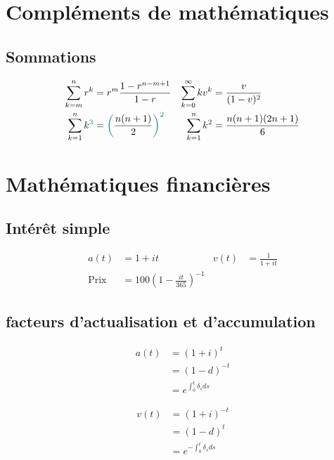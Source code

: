 \documentclass[10pt, french]{article}
\begin{document}
\begin{multicols*}{3}

\section*{Compléments de mathématiques}

\subsection*{Sommations}
\begin{align*}
\sum_{k = m}^{n} r^k &= r^{m} \frac{1 - r^{n - m + 1}}{1 - r} &
\sum_{k = 0}^{\infty}k v^k &= \frac{v}{(1 - v)^2} \\
\sum_{k = 1}^{n}k^{\textcolor{teal}{3}} &= \textcolor{teal}{\bigg(}\frac{n(n + 1)}{2}\textcolor{teal}{\bigg)^{2}} &
\sum_{k = 1}^{n}k^2 &= \frac{n(n + 1)(2n + 1)}{6} \\
\end{align*}

\section*{Mathématiques financières}

\subsection*{Intérêt simple}
\begin{align*}
	a(t)
		&=	1 + it &
	v(t)
		&=	\frac{1}{1 + it} \\
	\text{Prix}
		&=	100 \left( 1 - \frac{it}{365} \right)^{-1}
\end{align*}

\subsection*{facteurs d'actualisation et d'accumulation}
\begin{minipage}[t]{.5\linewidth}
\begin{align*}
	a(t) 
		&= 	(1 + i)^{t} 		\\
		&= 	(1 - d)^{-t}	\\
		&= 	e^{\int_{0}^{t} \delta_s ds} 
\end{align*}
\end{minipage}
\begin{minipage}[t]{.5\linewidth}
	\begin{align*}
	v(t) 
		&=	(1 + i)^{-t}		\\
		&=	(1 - d)^{t}	 	\\
		&= 	e^{-\int_{0}^{t} \delta_s ds} 
\end{align*}
\end{minipage}


\end{multicols*}
\end{document}
